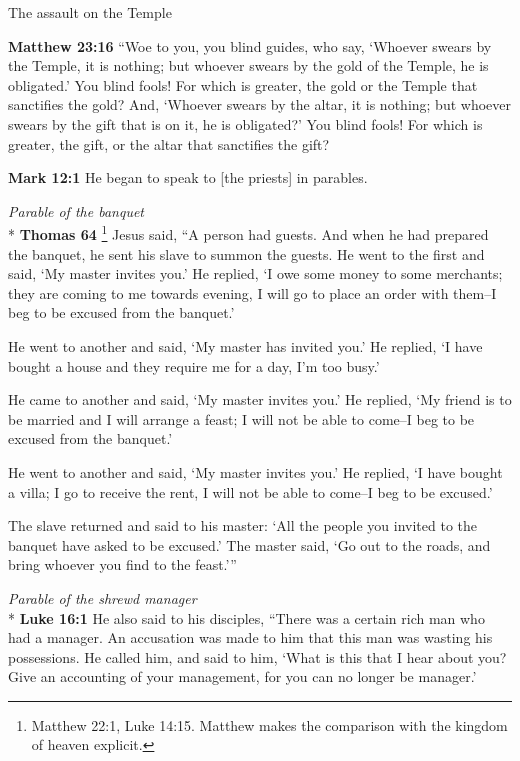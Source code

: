 \documentclass[10pt,a5paper,twoside]{article}
\newcommand{\quotesize}{\normalsize{}}
\newenvironment{quotetext}{\begingroup\quotesize}{\endgroup}
\newcommand{\intex}[1]{\index[texts]{#1}}
\newcommand{\bible}[2]{\begin{quotetext}\textbf{#1}\intex{#1} #2\end{quotetext}}
\newcommand{\matthew}[2]{\bible{Matthew #1}{#2}}
\newcommand{\gospelmark}[2]{\bible{Mark #1}{#2}}
\newcommand{\luke}[2]{\bible{Luke #1}{#2}}
\newcommand{\thomas}[2]{\bible{Thomas #1}{#2}}
\newcommand{\subhead}[1]{\emph{#1}\\*}
\begin{document}
\begin{section}{The assault on the Temple}

\matthew{23:16}{
``Woe to you, you blind guides, who say, `Whoever swears by the Temple, it is nothing; but whoever swears by the gold of the Temple, he is obligated.'    You blind fools! For which is greater, the gold or the Temple that sanctifies the gold?    And, `Whoever swears by the altar, it is nothing; but whoever swears by the gift that is on it, he is obligated?'    You blind fools! For which is greater, the gift, or the altar that sanctifies the gift?
}

\gospelmark{12:1}{
   He began to speak to [the priests] in parables.}

\subhead{Parable of the banquet}
\thomas{64}{\footnote{Matthew 22:1, Luke 14:15. Matthew makes the comparison with the kingdom of heaven explicit.}
Jesus said, ``A person had guests. And when he had prepared the banquet, he sent his
slave to summon the guests. He went to the first and said, `My
master invites you.' He replied, `I owe some money to some merchants;
they are coming to me towards evening, I will go to place an order
with them--I beg to be excused from the banquet.'

He went to another and said,
`My master has invited you.' He replied, `I
have bought a house and they require me for a day, I'm too busy.'

He came to another and said, `My master
invites you.' He replied, `My friend is to be married and I
will arrange a feast; I will not be able to come--I beg to be
excused from the banquet.'

He went to another and said, `My
master invites you.' He replied, `I have bought a villa; I go
to receive the rent, I will not be able to come--I beg to be
excused.'

The slave returned and said to his master: `All the people you
invited to the banquet have asked to be excused.' The master said,
`Go out to the roads, and bring whoever you find
to the feast.'{}''
}


\subhead{Parable of the shrewd manager}
\luke{16:1}{
He also said to his disciples, ``There was a certain rich man who had a manager. An accusation was made to him that this man was wasting his possessions.  
  He called him, and said to him, `What is this that I hear about you? Give an accounting of your management, for you can no longer be manager.'

}
\end{section}
\end{document}
